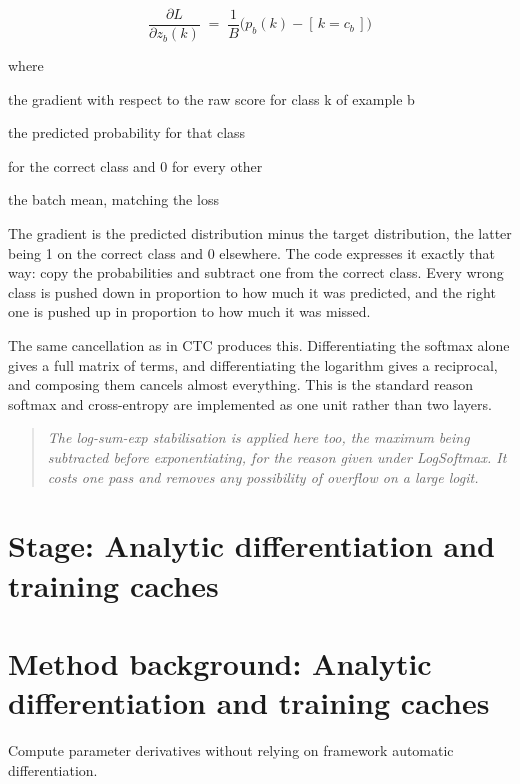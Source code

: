 \begin{equation}
\frac{\partial L}{\partial z_b(k)} \;=\; \frac{1}{B}\Big( p_b(k) - [\,k = c_b\,] \Big)
\end{equation}

\noindent where
\begin{description}[leftmargin=2.4em,style=nextline,font=\normalfont\ttfamily]\setlength\itemsep{1pt}
  \item[{$\frac{\partial L}{\partial z_b(k)}$}] \normalfont the gradient with respect to the raw score for class k of example b
  \item[{$p_b(k)$}] \normalfont the predicted probability for that class
  \item[{$[\,k = c_b\,]$}]  for the correct class and 0 for every other
  \item[{$\frac{1}{B}$}] \normalfont the batch mean, matching the loss
\end{description}
The gradient is the predicted distribution minus the target distribution, the latter being 1 on the correct class and 0 elsewhere. The code expresses it exactly that way: copy the probabilities and subtract one from the correct class. Every wrong class is pushed down in proportion to how much it was predicted, and the right one is pushed up in proportion to how much it was missed.

The same cancellation as in CTC produces this. Differentiating the softmax alone gives a full matrix of terms, and differentiating the logarithm gives a reciprocal, and composing them cancels almost everything. This is the standard reason softmax and cross-entropy are implemented as one unit rather than two layers.


\begin{quote}\small\itshape The log-sum-exp stabilisation is applied here too, the maximum being subtracted before exponentiating, for the reason given under LogSoftmax. It costs one pass and removes any possibility of overflow on a large logit.\end{quote}


\section*{Stage: Analytic differentiation and training caches}
\section{Method background: Analytic differentiation and training caches}\label{method:backward}
Compute parameter derivatives without relying on framework automatic differentiation.


